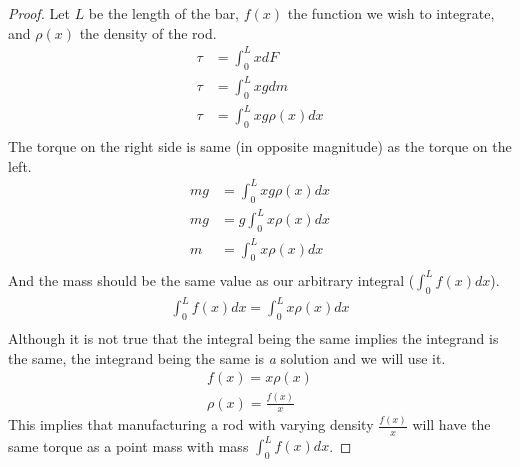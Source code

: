 \documentclass[letterpaper, 12pt]{article}
\begin{document}
\begin{proof}
    Let $L$ be the length of the bar, $f(x)$ the function we wish to integrate, and $\rho(x)$ the density of the rod.
    \begin{align*}
        \tau &= \int_0^L xdF\\
        \tau &= \int_0^L xgdm\\
        \tau &= \int_0^L xg\rho(x)dx\\
    \end{align*}
    The torque on the right side is same (in opposite magnitude) as the torque on the left.
    \begin{align*}
        mg &= \int_0^L xg\rho(x)dx\\
        mg &= g\int_0^L x\rho(x)dx\\
        m &= \int_0^L x\rho(x)dx\\
    \end{align*}
    And the mass should be the same value as our arbitrary integral ($\int_0^Lf(x)dx$).
    \begin{align*}
        \int_0^Lf(x)dx = \int_0^L x\rho(x)dx\\
    \end{align*}
    Although it is not true that the integral being the same implies the integrand is the same, the integrand being the same is \emph{a} solution and we will use it.
    \begin{align*}
        f(x) = x\rho(x)\\
        \rho(x) = \frac{f(x)}{x}
    \end{align*}
    This implies that manufacturing a rod with varying density $\frac{f(x)}{x}$ will have the same torque as a point mass with mass $\int_0^L f(x) dx$.
\end{proof}
\end{document}
